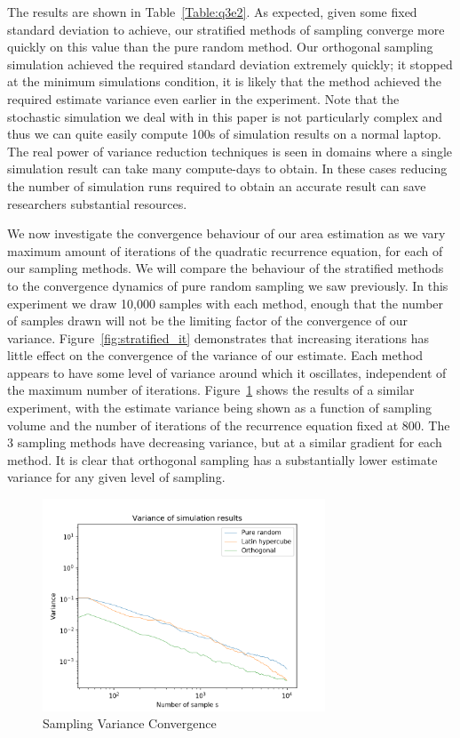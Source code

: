 \documentclass{article}
\begin{document}
    The results are shown in Table~\ref{Table:q3e2}. As expected, given some fixed standard deviation to achieve, our stratified methods of sampling converge more quickly on this value than the pure random method. Our orthogonal sampling simulation achieved the required standard deviation extremely quickly; it stopped at the minimum simulations condition, it is likely that the method achieved the required estimate variance even earlier in the experiment. Note that the stochastic simulation we deal with in this paper is not particularly complex and thus we can quite easily compute 100s of simulation results on a normal laptop. The real power of variance reduction techniques is seen in domains where a single simulation result can take many compute-days to obtain. In these cases reducing the number of simulation runs required to obtain an accurate result can save researchers substantial resources.

    We now investigate the convergence behaviour of our area estimation as we vary maximum amount of iterations of the quadratic recurrence equation, for each of our sampling methods. We will compare the behaviour of the stratified methods to the convergence dynamics of pure random sampling we saw previously. In this experiment we draw 10,000 samples with each method, enough that the number of samples drawn will not be the limiting factor of the convergence of our variance. Figure~\ref{fig:stratified_it} demonstrates that increasing iterations has little effect on the convergence of the variance of our estimate. Each method appears to have some level of variance around which it oscillates, independent of the maximum number of iterations.   Figure~\ref{fig:stratified_var} shows the results of a similar experiment, with the estimate variance being shown as a function of sampling volume and the number of iterations of the recurrence equation fixed at 800. The 3 sampling methods have decreasing variance, but at a similar gradient for each method. It is clear that orthogonal sampling has a substantially lower estimate variance for any given level of sampling.

    \begin{figure}[!tbp]
        \centering
        \includegraphics[width=0.75\textwidth]{pictures/part_3/q_3_variance.png}
        \caption{Sampling Variance Convergence}
        \label{fig:stratified_var}
    \end{figure}
\end{document}
